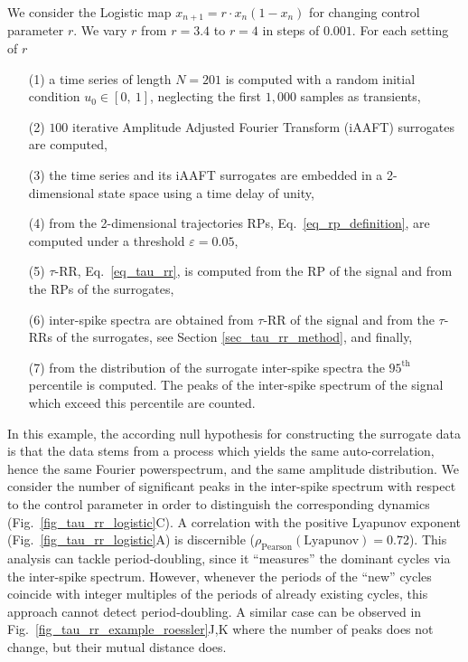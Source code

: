 \documentclass[entropy,article,submit,pdftex,moreauthors]{Definitions/mdpi}
\begin{document}
We consider the Logistic map $x_{n+1}=r\cdot x_n \left( 1-x_n \right)$ for changing control parameter $r$. We vary $r$ from $r=3.4$ to $r=4$ in steps of $0.001$. For 
each setting of $r$ 
\begin{itemize}[noitemsep]
\item[(1)] a time series of length $N=201$ is computed with a random initial condition $u_0 \in [0,\ 1]$, neglecting the first $1,000$ samples as transients,
\item[(2)] $100$ iterative Amplitude Adjusted Fourier Transform (iAAFT) surrogates \cite{Schreiber1996,Schreiber2000} are computed,
\item[(3)] the time series and its iAAFT surrogates are embedded in a 2-dimensional state space using a time delay of unity,
\item[(4)] from the 2-dimensional trajectories RPs, Eq.~\eqref{eq_rp_definition}, are computed under a threshold $\varepsilon=0.05$,
\item[(5)] $\tau$-RR, Eq.~\eqref{eq_tau_rr}, is computed from the RP of the signal and from the RPs of the surrogates,
\item[(6)] inter-spike spectra are obtained from $\tau$-RR of the signal and from the $\tau$-RRs of the surrogates, see Section \ref{sec_tau_rr_method}, and finally,
\item[(7)] from the distribution of the surrogate inter-spike spectra the $95^\text{th}$ percentile is computed. The peaks of the inter-spike spectrum of the signal which exceed 
this percentile are counted. 
\end{itemize}
In this example, the according null hypothesis for constructing the surrogate data is that the data stems from a process which yields the same auto-correlation, 
hence the same Fourier powerspectrum, and the same 
amplitude distribution. We consider the number of significant peaks in the inter-spike spectrum with
respect to the control parameter in order to distinguish the corresponding dynamics (Fig.~\ref{fig_tau_rr_logistic}C).
A correlation with the positive Lyapunov exponent (Fig.~\ref{fig_tau_rr_logistic}A) is discernible 
($\rho_{\text{Pearson}}(\text{Lyapunov})=0.72$). This analysis can tackle period-doubling, since it ``measures'' the dominant cycles via the inter-spike spectrum. 
However, whenever the periods of the ``new'' cycles coincide with integer multiples of the periods of already existing cycles, this approach cannot detect 
period-doubling. A similar case can be observed in Fig.~\ref{fig_tau_rr_example_roessler}J,K where the number of peaks does not change, but  their mutual distance does. 
\end{document}
